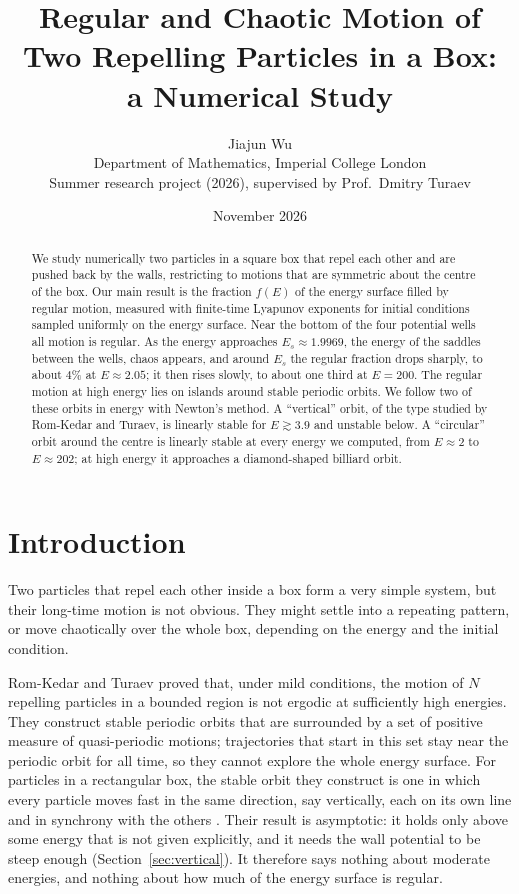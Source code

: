 \documentclass[11pt,a4paper]{article}
\title{Regular and Chaotic Motion of Two Repelling Particles in a Box:\\
a Numerical Study}
\author{Jiajun Wu\\[2pt]
\small Department of Mathematics, Imperial College London\\
\small Summer research project (2026), supervised by Prof.\ Dmitry Turaev}
\date{November 2026}
\begin{document}
\maketitle

\begin{abstract}
We study numerically two particles in a square box that repel each other and
are pushed back by the walls, restricting to motions that are symmetric about
the centre of the box. Our main result is the fraction $f(E)$ of the energy
surface filled by regular motion, measured with finite-time Lyapunov exponents
for initial conditions sampled uniformly on the energy surface. Near the
bottom of the four potential wells all motion is regular. As the energy
approaches $E_s\approx1.9969$, the energy of the saddles between the wells,
chaos appears, and around $E_s$ the regular fraction drops sharply, to about
$4\%$ at $E\approx2.05$; it then rises slowly, to about one third at $E=200$. The regular motion
at high energy lies on islands around stable periodic orbits. We follow two of
these orbits in energy with Newton's method. A ``vertical'' orbit, of the type
studied by Rom-Kedar and Turaev, is linearly stable for $E\gtrsim3.9$ and
unstable below. A ``circular'' orbit around the centre is linearly stable at
every energy we computed, from $E\approx2$ to $E\approx202$; at high energy it
approaches a diamond-shaped billiard orbit.
\end{abstract}

\section{Introduction}\label{sec:intro}

Two particles that repel each other inside a box form a very simple system,
but their long-time motion is not obvious. They might settle into a repeating
pattern, or move chaotically over the whole box, depending on the energy and
the initial condition.

Rom-Kedar and Turaev \cite{turaev2022} proved that, under mild conditions,
the motion of $N$ repelling particles in a bounded region is not ergodic at
sufficiently high energies. They construct stable periodic orbits that are
surrounded by a set of positive measure of quasi-periodic motions; trajectories
that start in this set stay near the periodic orbit for all time, so they
cannot explore the whole energy surface. For particles in a rectangular box,
the stable orbit they construct is one in which every particle moves fast in
the same direction, say vertically, each on its own line and in synchrony with
the others \cite[Sec.~2.6]{turaev2022}. Their result is asymptotic: it holds
only above some energy that is not given explicitly, and it needs the wall
potential to be steep enough (Section~\ref{sec:vertical}). It therefore says
nothing about moderate energies, and nothing about how much of the energy
surface is regular.
\end{document}

